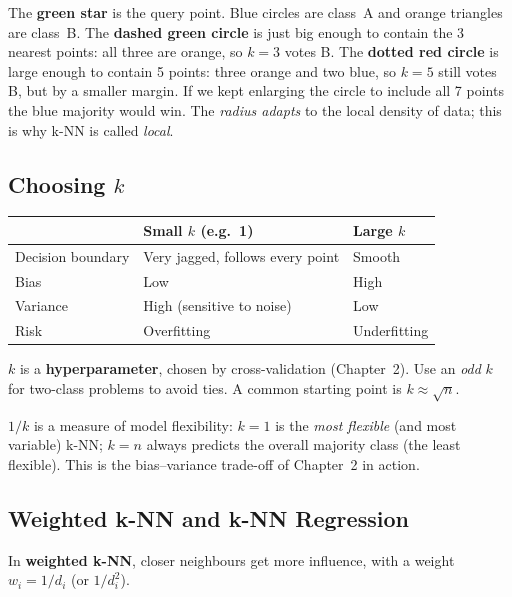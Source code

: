 \begin{explain}
The \textbf{green star} is the query point. Blue circles are class~A and orange triangles are class~B. The \textbf{dashed green circle} is just big enough to contain the 3 nearest points: all three are orange, so $k=3$ votes B. The \textbf{dotted red circle} is large enough to contain 5 points: three orange and two blue, so $k=5$ still votes B, but by a smaller margin. If we kept enlarging the circle to include all 7 points the blue majority would win. The \emph{radius adapts} to the local density of data; this is why k-NN is called \emph{local}.
\end{explain}


\subsection{Choosing $k$}

\begin{center}
\begin{tabular}{@{}p{2.8cm}p{5.5cm}p{5.5cm}@{}}
\toprule
 & \textbf{Small $k$ (e.g.\ 1)} & \textbf{Large $k$}\\
\midrule
Decision boundary & Very jagged, follows every point & Smooth\\
Bias & Low & High\\
Variance & High (sensitive to noise) & Low\\
Risk & Overfitting & Underfitting\\
\bottomrule
\end{tabular}
\end{center}

$k$ is a \textbf{hyperparameter}, chosen by cross-validation (Chapter~2). Use an \emph{odd} $k$ for two-class problems to avoid ties. A common starting point is $k\approx\sqrt n$.

\begin{keyidea}
$1/k$ is a measure of model flexibility: $k=1$ is the \emph{most flexible} (and most variable) k-NN; $k=n$ always predicts the overall majority class (the least flexible). This is the bias--variance trade-off of Chapter~2 in action.
\end{keyidea}

\subsection{Weighted k-NN and k-NN Regression}

In \textbf{weighted k-NN}, closer neighbours get more influence, with a weight $w_i=1/d_i$ (or $1/d_i^2$).

